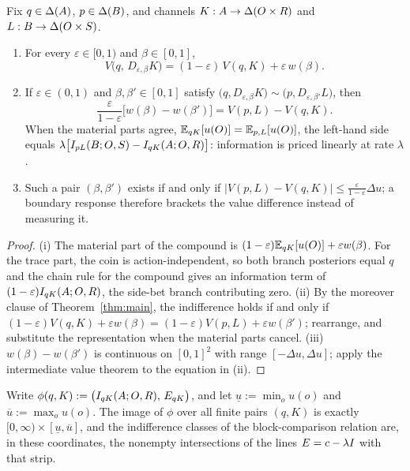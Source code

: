 \begin{proposition}\label{prop:wtp}
Fix $q\in\Delta(A)$, $p\in\Delta(B)$, and channels $K:A\to\Delta(O\times R)$ and $L:B\to\Delta(O\times S)$.
\begin{enumerate}[label=\textup{(\roman*)},leftmargin=*]
\item For every $\varepsilon\in[0,1)$ and $\beta\in[0,1]$,
\[
 V\bigl(q,\,D_{\varepsilon,\beta}K\bigr)=(1-\varepsilon)\,V(q,K)+\varepsilon\,w(\beta).
\]
\item If $\varepsilon\in(0,1)$ and $\beta,\beta'\in[0,1]$ satisfy
$\bigl(q,D_{\varepsilon,\beta}K\bigr)\sim\bigl(p,D_{\varepsilon,\beta'}L\bigr)$, then
\[
 \frac{\varepsilon}{1-\varepsilon}\bigl[w(\beta)-w(\beta')\bigr]
 =V(p,L)-V(q,K).
\]
When the material parts agree, $\mathbb E_{qK}[u(O)]=\mathbb E_{p,L}[u(O)]$, the left-hand side equals
$\lambda\bigl[I_{pL}(B;O,S)-I_{qK}(A;O,R)\bigr]$: information is priced linearly at rate $\lambda$.
\item Such a pair $(\beta,\beta')$ exists if and only if
$\lvert V(p,L)-V(q,K)\rvert\le\frac{\varepsilon}{1-\varepsilon}\Delta u$; a boundary response therefore brackets
the value difference instead of measuring it.
\end{enumerate}
\end{proposition}

\begin{proof}
(i) The material part of the compound is $(1-\varepsilon)\mathbb E_{qK}[u(O)]+\varepsilon w(\beta)$.  For the trace part,
the coin is action-independent, so both branch posteriors equal $q$ and the chain rule for the compound gives an
information term of $(1-\varepsilon)I_{qK}(A;O,R)$, the side-bet branch contributing zero.
(ii) By the moreover clause of Theorem~\ref{thm:main}, the indifference holds if and only if
$(1-\varepsilon)V(q,K)+\varepsilon w(\beta)=(1-\varepsilon)V(p,L)+\varepsilon w(\beta')$; rearrange, and
substitute the representation when the material parts cancel.
(iii) $w(\beta)-w(\beta')$ is continuous on $[0,1]^2$ with range $[-\Delta u,\Delta u]$; apply the intermediate
value theorem to the equation in \textup{(ii)}.
\end{proof}

\begin{lemma}\label{lem:info-payoff-plane}
Write $\phi(q,K):=\bigl(I_{qK}(A;O,R),\,E_{qK}\bigr)$, and let $\underline u:=\min_ou(o)$ and
$\overline u:=\max_ou(o)$.  The image of $\phi$ over all finite pairs $(q,K)$ is exactly
$[0,\infty)\times[\underline u,\overline u]$, and the indifference classes of the block-comparison relation are,
in these coordinates, the nonempty intersections of the lines $E=c-\lambda I$ with that strip.
\end{lemma}

